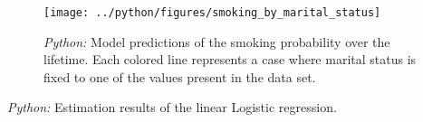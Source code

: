 \documentclass[11pt, a4paper, leqno]{article}
\begin{document}
\begin{figure}[H]

    \centering
    \texttt{[image: ../python/figures/smoking\_by\_marital\_status]}

    \caption{\emph{Python:} Model predictions of the smoking probability over the
        lifetime. Each colored line represents a case where marital status is fixed to one
        of the values present in the data set.}
    \label{fig:python-predictions}

\end{figure}


\begin{table}[!h]
    
    \caption{\label{tab:python-summary}\emph{Python:} Estimation results of the
        linear Logistic regression.}
\end{table}







\printbibliography
{}



\end{document}
